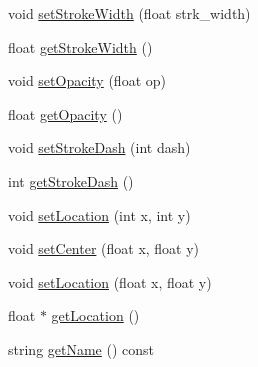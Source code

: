 \begin{DoxyCompactItemize}
\item 
void \mbox{\hyperlink{classbridges_1_1datastructure_1_1_symbol_a56238a4535a26bc3eea698eea4b65921}{set\+Stroke\+Width}} (float strk\+\_\+width)
\item 
float \mbox{\hyperlink{classbridges_1_1datastructure_1_1_symbol_a4274feed56b8dfe89ffa3f791ece2ebd}{get\+Stroke\+Width}} ()
\item 
void \mbox{\hyperlink{classbridges_1_1datastructure_1_1_symbol_a889bace56d39df0ac09ba408ca868b7d}{set\+Opacity}} (float op)
\item 
float \mbox{\hyperlink{classbridges_1_1datastructure_1_1_symbol_af77f6e4c42ca97672888d863335b851a}{get\+Opacity}} ()
\item 
void \mbox{\hyperlink{classbridges_1_1datastructure_1_1_symbol_afd39d3b65d22bc2a1be64c8728f5e5d7}{set\+Stroke\+Dash}} (int dash)
\item 
int \mbox{\hyperlink{classbridges_1_1datastructure_1_1_symbol_a5fd32d1310c9ef97b07acab8efb17808}{get\+Stroke\+Dash}} ()
\item 
void \mbox{\hyperlink{classbridges_1_1datastructure_1_1_symbol_a9c62675b598fc5e755721576852f2dcf}{set\+Location}} (int x, int y)
\item 
void \mbox{\hyperlink{classbridges_1_1datastructure_1_1_symbol_a98a1c3d133e7fe2150d933495e421760}{set\+Center}} (float x, float y)
\item 
void \mbox{\hyperlink{classbridges_1_1datastructure_1_1_symbol_a4dbf51dac8b22b293a7061f5eb84b460}{set\+Location}} (float x, float y)
\item 
float $\ast$ \mbox{\hyperlink{classbridges_1_1datastructure_1_1_symbol_aeb4ec154605998d77dd9f96aa99ff16a}{get\+Location}} ()
\item 
string \mbox{\hyperlink{classbridges_1_1datastructure_1_1_symbol_a9365f8d91faf67e14ceaa89f8a5d0338}{get\+Name}} () const
\end{DoxyCompactItemize}

